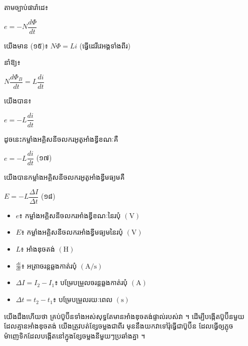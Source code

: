 
តាមច្បាប់ផារ៉ាដេ៖
\begin{center}
	$e = -N\dfrac{d\Phi}{dt}$
\end{center}

យើងមាន (១៥)៖ $N\Phi = Li$ \quad (ធ្វើដេរីវេអង្គទាំងពីរ)

នាំឱ្យ៖
\begin{center}
	$N\dfrac{d\Phi_B}{dt} = L\dfrac{di}{dt}$
\end{center}

យើងបាន៖
\begin{center}
	$e = -L\dfrac{di}{dt}$
\end{center}

ដូចនេះកម្លាំងអគ្គិសនីចលករអូតូអាំងឌ្វីខណៈគឺ
\begin{center}
	$\boxed{e = -L\dfrac{di}{dt}}$ \quad (១៧)
\end{center}

យើងបានកម្លាំងអគ្គិសនីចលករអូតូអាំងឌ្វីមធ្យមគឺ
\begin{center}
	$\boxed{E = -L\dfrac{\Delta I}{\Delta t}}$ \quad (១៨)
\end{center}

\begin{itemize}[itemsep=2pt, topsep=4pt, parsep=0pt, leftmargin=1.6em]
	\item $e$៖ កម្លាំងអគ្គិសនីចលករអាំងឌ្វីខណៈនៃរបុំ $(\text{V})$
	\item $E$៖ កម្លាំងអគ្គិសនីចលករអាំងឌ្វីមធ្យមនៃរបុំ $(\text{V})$
	\item $L$៖ អាំងឌុចតង់ $(\text{H})$
	\item $\frac{di}{dt}$៖ អត្រាចរន្តឆ្លងកាត់របុំ $(\text{A/s})$
	\item $\Delta I = I_2 - I_1$៖ បម្រែបម្រួលចរន្តឆ្លងកាត់របុំ $(\text{A})$
	\item $\Delta t = t_2 - t_1$៖ បម្រែបម្រួលរយៈពេល $(\text{s})$
\end{itemize}


\noindent
\begin{minipage}[t]{0.58\textwidth}
	\vspace{0pt}
	\raggedright
	យើងដឹងហើយថា គ្រប់ប៊ូប៊ីនទាំងអស់សុទ្ធតែមានអាំងឌុចតង់ផ្ទាល់របស់វា ។ ដើម្បីបង្កើតប៊ូប៊ីនមួយដែលគ្មានអាំងឌុចតង់ យើងត្រូវបត់ខ្សែចម្លងជាពីរ មុននឹងយកវាទៅរុំធ្វើជាប៊ូប៊ីន ដែលធ្វើឲ្យភ្លុចម៉ាញេទិកដែលបង្កើតនៅក្នុងខ្សែចម្លងនីមួយៗប្រឆាំងគ្នា ។
\end{minipage}%
\hfill
\begin{minipage}[t]{0.40\textwidth}
	\vspace{0pt}
\end{minipage}

